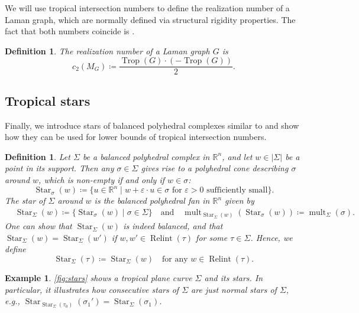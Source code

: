 \documentclass[11pt,reqno,a4paper]{amsart}
\theoremstyle{theoremstyle}
\theoremstyle{examplestyle}
\newtheorem{example}[theorem]{Example}
\newtheorem{definition}[theorem]{Definition}
\theoremstyle{algorithmstyle}
\newcommand{\RR}{\mathbb{R}}
\DeclareMathOperator{\mult}{mult}
\DeclareMathOperator{\Relint}{Relint}
\DeclareMathOperator{\Trop}{Trop}
\DeclareMathOperator{\Star}{Star}
\begin{document}
We will use tropical intersection numbers to define the realization number of a Laman graph, which are normally defined via structural rigidity properties.  The fact that both numbers coincide is \cite[Theorem 3.8]{ClarkeDewarTrippMaxwellNixonRenSmith2025}.

\begin{definition}
  \label{thm:realisationNumber}
  The \emph{realization number} of a Laman graph $G$ is
  \begin{equation*}
    c_2(M_G) \coloneqq \frac{\Trop(G)\cdot (-\Trop(G))}{2}.
  \end{equation*}
\end{definition}

\subsection{Tropical stars}
Finally, we introduce stars of balanced polyhedral complexes similar to \cite[Definition 2.3.6]{MaclaganSturmfels2015} and show how they can be used for lower bounds of tropical intersection numbers.

\begin{definition}
  \label{def:star}
  Let $\Sigma$ be a balanced polyhedral complex in $\RR^n$, and let $w\in|\Sigma|$ be a point in its support.  Then any $\sigma\in\Sigma$ gives rise to a polyhedral cone describing $\sigma$ around $w$, which is non-empty if and only if $w\in\sigma$:
  \begin{equation*}
    \Star_\sigma(w)\coloneqq \{u\in\RR^n \mid w + \varepsilon\cdot u\in\sigma \text{ for }\varepsilon>0 \text{ sufficiently small}\}.
  \end{equation*}
  The \emph{star} of $\Sigma$ around $w$ is the balanced polyhedral fan in $\RR^n$ given by
  \begin{align*}
    & \Star_\Sigma(w)\coloneqq \{\Star_\sigma(w)\mid \sigma\in\Sigma\} \quad\text{and}\quad \mult_{\Star_\Sigma(w)}(\Star_\sigma(w))\coloneqq \mult_\Sigma(\sigma).
  \end{align*}
  One can show that $\Star_\Sigma(w)$ is indeed balanced, and that $\Star_\Sigma(w)=\Star_\Sigma(w')$ if $w, w' \in\Relint(\tau)$ for some $\tau\in\Sigma$.  Hence, we define
  \begin{equation*}
    \Star_\Sigma(\tau)\coloneqq \Star_\Sigma(w)\quad\text{for any }w\in\Relint(\tau).
  \end{equation*}
\end{definition}

\begin{example}
  \label{ex:star}
  \cref{fig:stars} shows a tropical plane curve $\Sigma$ and its stars.  In particular, it illustrates how consecutive stars of $\Sigma$ are just normal stars of $\Sigma$, e.g., $\Star_{\Star_\Sigma(\tau_0)}(\sigma_1')=\Star_\Sigma(\sigma_1)$.
\end{example}
\end{document}
